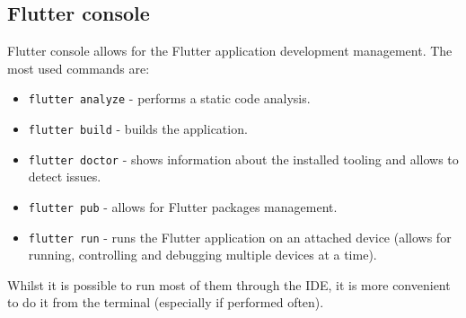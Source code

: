 \subsection{Flutter console}
Flutter console allows for the Flutter application development management. The most used commands are:
\begin{itemize}
    \item \texttt{flutter analyze} - performs a static code analysis.
    \item \texttt{flutter build} - builds the application.
    \item \texttt{flutter doctor} - shows information about the installed tooling and allows to detect issues.
    \item \texttt{flutter pub} - allows for Flutter packages management.
    \item \texttt{flutter run} - runs the Flutter application on an attached device (allows for running, controlling and debugging multiple devices at a time).
\end{itemize}
Whilst it is possible to run most of them through the IDE, it is more convenient to do it from the terminal (especially if performed often).


